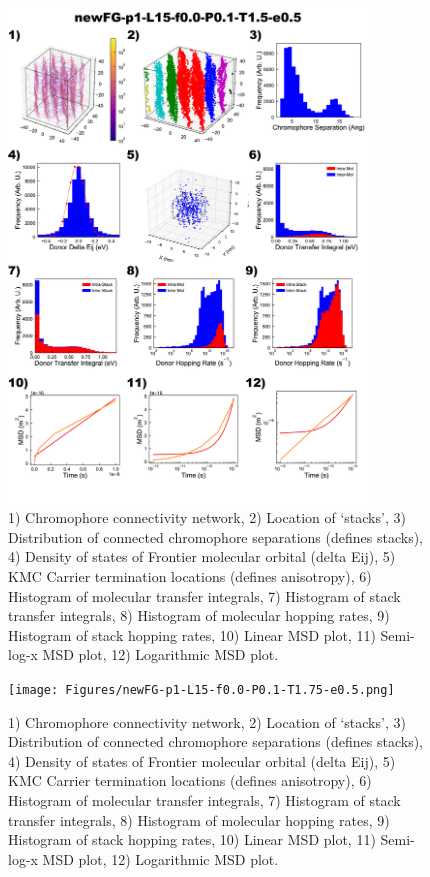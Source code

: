 \documentclass[12pt]{article}
\begin{document}
\begin{figure}[h]\centering
	\includegraphics[width=0.85\textwidth]{Figures/newFG-p1-L15-f0.0-P0.1-T1.5-e0.5.png}
    \caption{   1) Chromophore connectivity network, 
                2) Location of `stacks', 
                3) Distribution of connected chromophore separations (defines stacks),
                4) Density of states of Frontier molecular orbital (delta Eij),
                5) KMC Carrier termination locations (defines anisotropy),
                6) Histogram of molecular transfer integrals,
                7) Histogram of stack transfer integrals,
                8) Histogram of molecular hopping rates,
                9) Histogram of stack hopping rates,
                10) Linear MSD plot,
                11) Semi-log-x MSD plot,
                12) Logarithmic MSD plot.}
	\label{fig:noMapT1.5}
\end{figure}


\begin{figure}[h]\centering
	\texttt{[image: Figures/newFG-p1-L15-f0.0-P0.1-T1.75-e0.5.png]}
    \caption{   1) Chromophore connectivity network, 
                2) Location of `stacks', 
                3) Distribution of connected chromophore separations (defines stacks),
                4) Density of states of Frontier molecular orbital (delta Eij),
                5) KMC Carrier termination locations (defines anisotropy),
                6) Histogram of molecular transfer integrals,
                7) Histogram of stack transfer integrals,
                8) Histogram of molecular hopping rates,
                9) Histogram of stack hopping rates,
                10) Linear MSD plot,
                11) Semi-log-x MSD plot,
                12) Logarithmic MSD plot.}
	\label{fig:noMapT1.75}
\end{figure}
\end{document}
